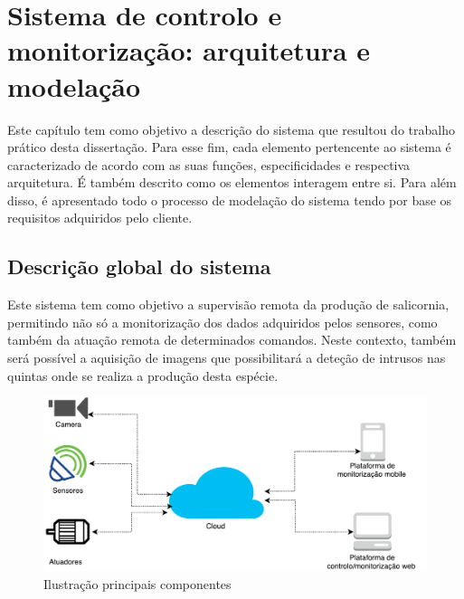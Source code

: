 

\chapter{Sistema de controlo e monitorização: arquitetura e modelação}


Este capítulo tem como objetivo a descrição do sistema que resultou do trabalho prático
desta dissertação. Para esse fim, cada elemento pertencente ao sistema é caracterizado de
acordo com as suas funções, especificidades e respectiva arquitetura. É também descrito como os elementos interagem entre si. Para além disso, é apresentado todo o processo de modelação do sistema tendo por base os requisitos adquiridos pelo cliente. 








\section{Descrição global do sistema}

Este sistema tem como objetivo a supervisão remota da produção de salicornia,  permitindo não só a monitorização dos dados adquiridos pelos sensores, como também da atuação remota de determinados comandos. Neste contexto, também será possível a aquisição de imagens que possibilitará a deteção de intrusos nas quintas onde se realiza a produção desta espécie.


\begin{figure}[!htb]
	\centering
	\includegraphics[scale=0.45]{esquemas/global_arquitetura.pdf}
	\caption{Ilustração principais componentes}
	\label{componentesall}
\end{figure}



